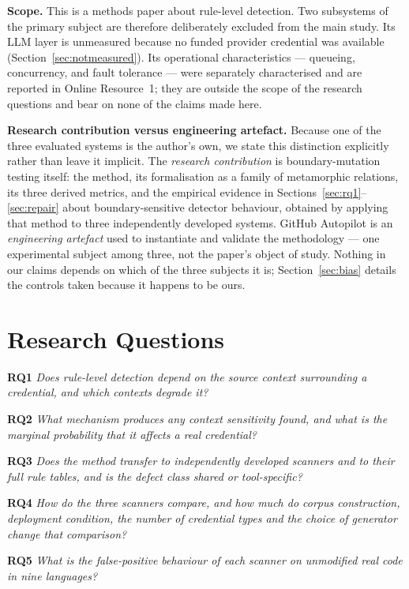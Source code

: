 \documentclass[pdflatex,sn-basic]{sn-jnl}
\newcommand{\researchq}[1]{\textbf{RQ#1}}
\begin{document}
\medskip\noindent\textbf{Scope.} This is a methods paper about rule-level detection. Two subsystems of the primary subject are therefore deliberately excluded from the main study. Its LLM layer is unmeasured because no funded provider credential was available (Section~\ref{sec:notmeasured}). Its operational characteristics --- queueing, concurrency, and fault tolerance --- were separately characterised and are reported in Online Resource~1; they are outside the scope of the research questions and bear on none of the claims made here.

\medskip\noindent\textbf{Research contribution versus engineering artefact.} Because one of the three evaluated systems is the author's own, we state this distinction explicitly rather than leave it implicit. The \emph{research contribution} is boundary-mutation testing itself: the method, its formalisation as a family of metamorphic relations, its three derived metrics, and the empirical evidence in Sections~\ref{sec:rq1}--\ref{sec:repair} about boundary-sensitive detector behaviour, obtained by applying that method to three independently developed systems. GitHub Autopilot is an \emph{engineering artefact} used to instantiate and validate the methodology --- one experimental subject among three, not the paper's object of study. Nothing in our claims depends on which of the three subjects it is; Section~\ref{sec:bias} details the controls taken because it happens to be ours.

\section{Research Questions}

\noindent\researchq{1} \emph{Does rule-level detection depend on the source context surrounding a credential, and which contexts degrade it?}

\noindent\researchq{2} \emph{What mechanism produces any context sensitivity found, and what is the marginal probability that it affects a real credential?}

\noindent\researchq{3} \emph{Does the method transfer to independently developed scanners and to their full rule tables, and is the defect class shared or tool-specific?}

\noindent\researchq{4} \emph{How do the three scanners compare, and how much do corpus construction, deployment condition, the number of credential types and the choice of generator change that comparison?}

\noindent\researchq{5} \emph{What is the false-positive behaviour of each scanner on unmodified real code in nine languages?}
\end{document}
